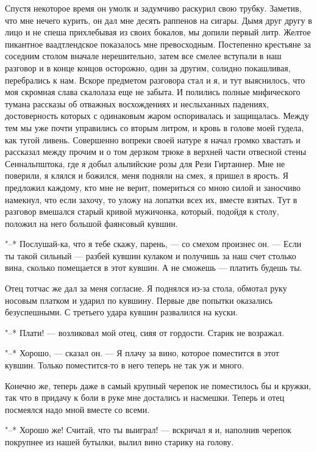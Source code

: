 Спустя  некоторое время  он умолк  и задумчиво  раскурил свою  трубку.
Заметив, что мне нечего курить, он  дал мне десять раппенов на сигары.
Дымя  друг другу  в  лицо и  не спеша  прихлебывая  из своих  бокалов,
мы  допили  первый  литр. Желтое  пикантное  ваадтлендское  показалось
мне  превосходным. Постепенно  крестьяне  за  соседним столом  вначале
нерешительно,  затем все  смелее вступали  в  наш разговор  и в  конце
концов осторожно,  один за  другим, солидно покашливая,  перебрались к
нам. Вскоре  предметом разговора стал и  я, и тут выяснилось,  что моя
скромная слава скалолаза еще не  забыта. И полились полные мифического
тумана  рассказы  об  отважных восхождениях  и  неслыханных  падениях,
достоверность которых  с одинаковым  жаром оспоривалась  и защищалась.
Между тем мы  уже почти управились со вторым литром,  и кровь в голове
моей гудела, как тугой ливень. Совершенно вопреки своей натуре я начал
громко  хвастать и  рассказал между  прочим и  о том  дерзком трюке  в
верхней  части отвесной  стены Сеннальпштока,  где я  добыл альпийские
розы для  Рези Гиртаннер. Мне  не поверили,  я клялся и  божился, меня
подняли на  смех, я пришел в  ярость. Я предложил каждому,  кто мне не
верит, помериться со мною силой и заносчиво намекнул, что если захочу,
то уложу  на лопатки всех их,  вместе взятых. Тут в  разговор вмешался
старый кривой  мужичонка, который,  подойдя к  столу, положил  на него
большой фаянсовый кувшин.

"--* Послушай-ка, что я тебе скажу, парень, --- со смехом произнес он.
--- Если ты такой сильный ---  разбей кувшин кулаком и получишь за наш
счет столько вина, сколько помещается в  этот кувшин. А не сможешь ---
платить будешь ты.

Отец тотчас же  дал за меня согласие. Я поднялся  из-за стола, обмотал
руку носовым платком и ударил по кувшину. Первые две попытки оказались
безуспешными. С третьего удара кувшин развалился на куски.

"--*  Плати! ---  возликовал мой  отец,  сияя от  гордости. Старик  не
возражал.

"--* Хорошо, --- сказал он. ---  Я плачу за вино, которое поместится в
этот кувшин. Только поместится-то в него теперь не так уж и много.

Конечно же,  теперь даже в самый  крупный черепок не поместилось  бы и
кружки, так  что в  придачу к  боли в руке  мне достались  и насмешки.
Теперь и отец посмеялся надо мной вместе со всеми.

"--* Хорошо  же! Считай, что  ты выиграл!  --- вскричал я  и, наполнив
черепок покрупнее из нашей бутылки, вылил вино старику на голову.

